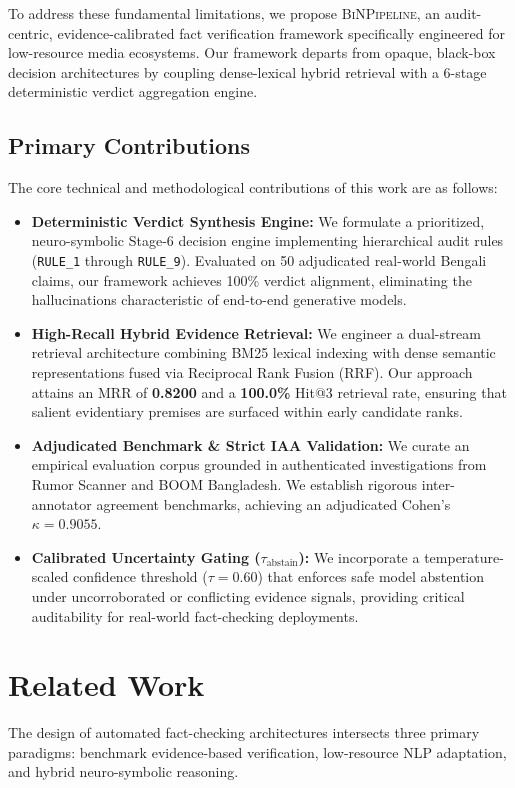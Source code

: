 \documentclass[11pt,a4paper]{article}
\begin{document}
To address these fundamental limitations, we propose \textsc{BiNPipeline}, an audit-centric, evidence-calibrated fact verification framework specifically engineered for low-resource media ecosystems. Our framework departs from opaque, black-box decision architectures by coupling dense-lexical hybrid retrieval with a 6-stage deterministic verdict aggregation engine.

\subsection{Primary Contributions}
The core technical and methodological contributions of this work are as follows:
\begin{itemize}
    \item \textbf{Deterministic Verdict Synthesis Engine:} We formulate a prioritized, neuro-symbolic Stage-6 decision engine implementing hierarchical audit rules (\texttt{RULE\_1} through \texttt{RULE\_9}). Evaluated on 50 adjudicated real-world Bengali claims, our framework achieves 100\% verdict alignment, eliminating the hallucinations characteristic of end-to-end generative models.
    \item \textbf{High-Recall Hybrid Evidence Retrieval:} We engineer a dual-stream retrieval architecture combining BM25 lexical indexing with dense semantic representations fused via Reciprocal Rank Fusion (RRF). Our approach attains an MRR of \textbf{0.8200} and a \textbf{100.0\%} Hit@3 retrieval rate, ensuring that salient evidentiary premises are surfaced within early candidate ranks.
    \item \textbf{Adjudicated Benchmark \& Strict IAA Validation:} We curate an empirical evaluation corpus grounded in authenticated investigations from Rumor Scanner and BOOM Bangladesh. We establish rigorous inter-annotator agreement benchmarks, achieving an adjudicated Cohen's $\kappa = \mathbf{0.9055}$.
    \item \textbf{Calibrated Uncertainty Gating ($\tau_{\text{abstain}}$):} We incorporate a temperature-scaled confidence threshold ($\tau = 0.60$) that enforces safe model abstention under uncorroborated or conflicting evidence signals, providing critical auditability for real-world fact-checking deployments.
\end{itemize}

\section{Related Work}
\label{sec:related_work}
The design of automated fact-checking architectures intersects three primary paradigms: benchmark evidence-based verification, low-resource NLP adaptation, and hybrid neuro-symbolic reasoning.
\end{document}
